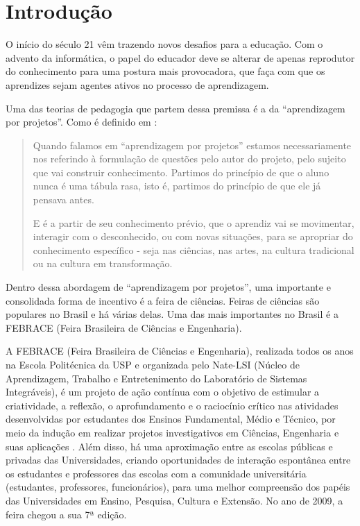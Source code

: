 
\chapter{Introdução}

O início do século 21 vêm trazendo novos desafios para a educação. Com o advento da informática, o papel do educador deve se alterar de apenas reprodutor do conhecimento para uma postura mais provocadora, que faça com que os aprendizes sejam agentes ativos no processo de aprendizagem. 

Uma das teorias de pedagogia que partem dessa premissa é a da “aprendizagem por projetos”. Como é definido em :

\begin{quotation}
    Quando falamos em “aprendizagem por projetos” estamos necessariamente nos referindo à formulação de questões pelo autor do projeto, pelo sujeito que vai construir conhecimento. Partimos do princípio de que o aluno nunca é uma tábula rasa, isto é, partimos do princípio de que ele já pensava antes.

    E é a partir de seu conhecimento prévio, que o aprendiz vai se movimentar, interagir com o desconhecido, ou com novas situações, para se apropriar do conhecimento específico - seja nas ciências, nas artes, na cultura tradicional ou na cultura em transformação.
\end{quotation}

Dentro dessa abordagem de “aprendizagem por projetos”, uma importante e consolidada forma de incentivo é a feira de ciências. Feiras de ciências são populares no Brasil e há várias delas. Uma das mais importantes no Brasil é a FEBRACE (Feira Brasileira de Ciências e Engenharia).

A FEBRACE (Feira Brasileira de Ciências e Engenharia), realizada todos os anos na Escola Politécnica da USP e organizada pelo Nate-LSI (Núcleo de Aprendizagem, Trabalho e Entretenimento do Laboratório de Sistemas Integráveis), é um projeto de ação contínua com o objetivo de estimular a criatividade, a reflexão, o aprofundamento e o raciocínio crítico nas atividades desenvolvidas por estudantes dos Ensinos Fundamental, Médio e Técnico, por meio da indução em realizar projetos investigativos em Ciências, Engenharia e suas aplicações \cite{lopes07}. Além disso, há uma aproximação entre as escolas públicas e privadas das Universidades, criando oportunidades de interação espontânea entre os estudantes e professores das escolas com a comunidade universitária (estudantes, professores, funcionários), para uma melhor compreensão dos papéis das Universidades em Ensino, Pesquisa, Cultura e Extensão. No ano de 2009, a feira chegou a sua 7ª edição.

